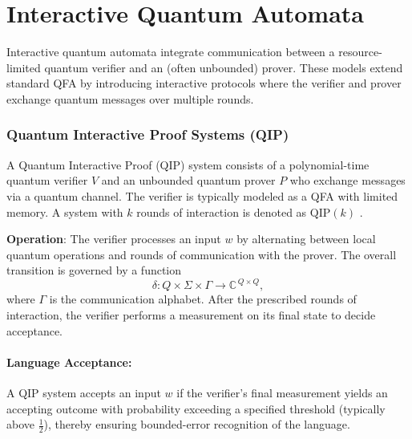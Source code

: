 \section{Interactive Quantum Automata}
\label{sec:interactive-quantum}

Interactive quantum automata integrate communication between a resource-limited quantum verifier and an (often unbounded) prover. These models extend standard QFA by introducing interactive protocols where the verifier and prover exchange quantum messages over multiple rounds.

\subsubsection{Quantum Interactive Proof Systems (QIP)}
\label{sssec:qip}
\begin{definition}
A Quantum Interactive Proof (QIP) system consists of a polynomial-time quantum verifier \( V \) and an unbounded quantum prover \( P \) who exchange messages via a quantum channel. The verifier is typically modeled as a QFA with limited memory. A system with \( k \) rounds of interaction is denoted as \(\text{QIP}(k)\) \cite{nishimura2009application, zheng2015power}.
\end{definition}

\textbf{Operation}:  
The verifier processes an input \( w \) by alternating between local quantum operations and rounds of communication with the prover. The overall transition is governed by a function
\[
\delta: Q \times \Sigma \times \Gamma \to \mathbb{C}^{\, Q \times Q},
\]
where \( \Gamma \) is the communication alphabet. After the prescribed rounds of interaction, the verifier performs a measurement on its final state to decide acceptance.

\paragraph{Language Acceptance:}  
A QIP system accepts an input \( w \) if the verifier’s final measurement yields an accepting outcome with probability exceeding a specified threshold (typically above \( \frac{1}{2} \)), thereby ensuring bounded-error recognition of the language.

